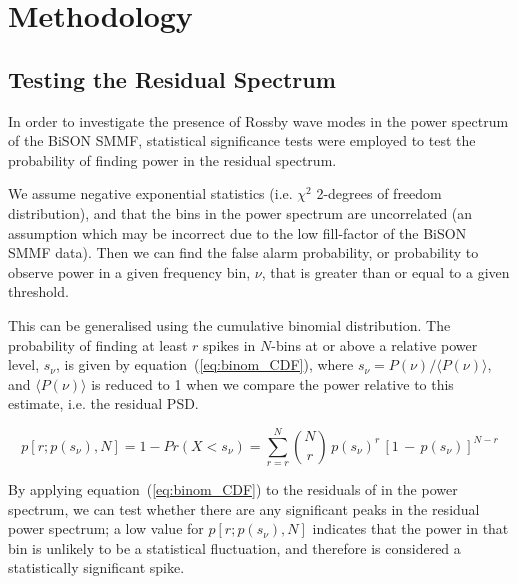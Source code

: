 \section{Methodology}\label{sec:r-mode_method}

\subsection{Testing the Residual Spectrum}
In order to investigate the presence of Rossby wave modes in the power spectrum of the BiSON SMMF, statistical significance tests were employed to test the probability of finding power in the residual spectrum.

We assume negative exponential statistics (i.e. $\chi^2$ 2-degrees of freedom distribution), and that the bins in the power spectrum are uncorrelated (an assumption which may be incorrect due to the low fill-factor of the BiSON SMMF data). Then we can find the false alarm probability, or probability to observe power in a given frequency bin, $\nu$, that is greater than or equal to a given threshold.

This can be generalised using the cumulative binomial distribution. The probability of finding at least $r$ spikes in $N$-bins at or above a relative power level, $s_{\nu}$, is given by equation~(\ref{eq:binom_CDF}), where $s_{\nu} = P(\nu)/\langle P(\nu) \rangle$, and $\langle P(\nu) \rangle$ is reduced to 1 when we compare the power relative to this estimate, i.e. the residual PSD.

\begin{equation}
p[r; p(s_\nu), N] = 1 - Pr(X < s_{\nu}) = \sum_{r=r}^{N} \binom{N}{r} \, p(s_{\nu})^r \, [1 \, - \, p(s_{\nu})]^{N-r}
\label{eq:binom_CDF}
\end{equation}

By applying equation~(\ref{eq:binom_CDF}) to the residuals of in the power spectrum, we can test whether there are any significant peaks in the residual power spectrum; a low value for $p[r; p(s_\nu), N]$ indicates that the power in that bin is unlikely to be a statistical fluctuation, and therefore is considered a statistically significant spike.

